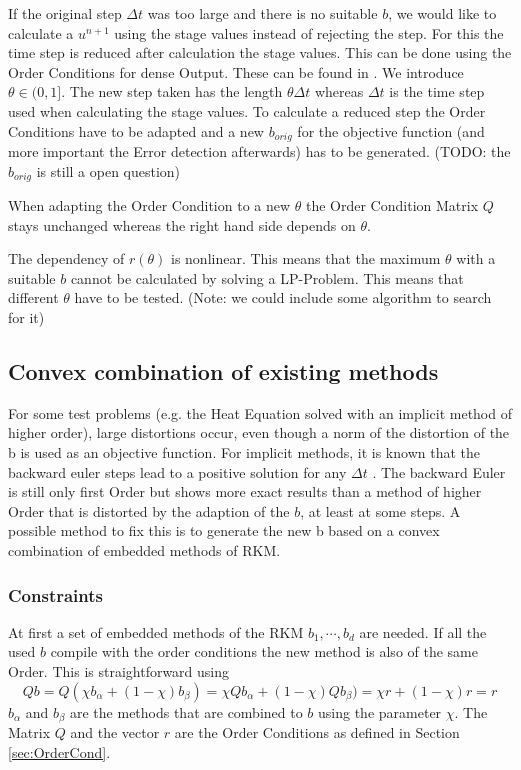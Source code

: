 \documentclass{article}
\begin{document}
If the original step $\Delta t$ was too large and there is no suitable $b$, we would like to calculate a $u^{n+1}$ using the stage values instead of rejecting the step. For this the time step is reduced after calculation the stage values. This can be done using the Order Conditions for dense Output. These can be found in \cite{hairer_runge-kutta_1993}.
We introduce $\theta \in (0,1]$. The new step taken has the length $\theta \Delta t$ whereas $\Delta t$ is the time step used when calculating the stage values.
To calculate a reduced step the Order Conditions have to be adapted and a new $b_{orig}$ for the objective function (and more important the Error detection afterwards) has to be generated. 
(TODO: the $b_{orig}$ is still a open question)

When adapting the Order Condition to a new $\theta$ the Order Condition Matrix $Q$ stays unchanged whereas the right hand side depends on $\theta$.

The dependency of $r(\theta)$ is nonlinear. This means that the maximum $\theta$ with a suitable $b$ cannot be calculated by solving a LP-Problem. This means that different $\theta$ have to be tested. 
(Note: we could include some algorithm to search for it)

\subsection{Convex combination of existing methods}\label{sec:convex}
For some test problems (e.g. the Heat Equation solved with an implicit method of higher order), large distortions occur, even though a norm of the distortion of the b is used as an objective function. 
For implicit methods, it is known that the backward euler steps lead to a positive solution for any $\Delta t$ \cite{hundsdorfer_numerical_2003}. The backward Euler is still only first Order but shows more exact results than a method of higher Order that is distorted by the adaption of the $b$, at least at some steps. 
A possible method to fix this is to generate the new b based on a convex combination of embedded methods of RKM. 

\subsubsection{Constraints}
At first a set of embedded methods of the RKM $b_1,\cdots,b_d$ are needed. 
If all the used $b$ compile with the order conditions the new method is also of the same Order.
This is straightforward using
$$ Q b = Q (\chi b_{\alpha} + (1-\chi) b_{\beta}) = \chi Q  b_{\alpha} + (1-\chi) Q b_{\beta}) = \chi r + (1-\chi) r = r$$
$b_{\alpha}$ and $b_{\beta}$ are the methods that are combined to $b$ using the parameter $\chi$. The Matrix $Q$ and the vector $r$ are the Order Conditions as defined in Section\,\ref{sec:OrderCond}.
\end{document}
